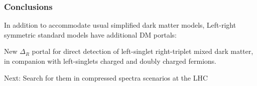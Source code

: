 \documentclass[%
xcolor=dvipsnames,table%
]{beamer}
\begin{document}
\begin{frame}
  \frametitle{Conclusions}
  In addition to accommodate usual simplified dark matter models,  Left-right symmetric standard models have additional DM portals:

  New $\Delta_R$ portal for direct detection of left-singlet right-triplet mixed dark matter, in companion with left-singlets charged and doubly charged fermions.

Next: Search for them in compressed spectra scenarios at the LHC
\end{frame}

\end{document}
